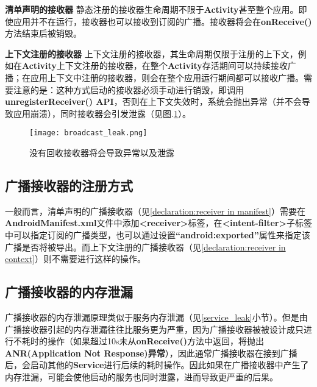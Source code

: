 \textbf{清单声明的接收器 } 静态注册的接收器生命周期不限于\textbf{Activity}甚至整个应用。即使应用并不在运行，接收器也可以接收到订阅的广播。接收器将会在\textbf{onReceive()}方法结束后被销毁。


\textbf{上下文注册的接收器 } 上下文注册的接收器，其生命周期仅限于注册的上下文，例如在\textbf{Activity}上下文注册的接收器，在整个\textbf{Activity}存活期间可以持续接收广播；在应用上下文中注册的接收器，则会在整个应用运行期间都可以接收广播。需要注意的是：这种方式启动的接收器必须手动进行销毁，即调用\textbf{unregisterReceiver() API}，否则在上下文失效时，系统会抛出异常（并不会导致应用崩溃），同时接收器会引发泄露（见图.\textcolor{red}{\ref{fig:broadcast_leak}}）。

\begin{figure}[htbp]
	\centering
	\texttt{[image: broadcast\_leak.png]} %
	\caption{没有回收接收器将会导致异常以及泄露}
	\label{fig:broadcast_leak}
\end{figure}

\subsection{广播接收器的注册方式}

一般而言，清单声明的广播接收器（见\ref{declaration:receiver in manifest}）需要在\textbf{AndroidManifest.xml}文件中添加\textbf{<receiver>}标签，在\textbf{<intent-filter>}子标签中可以指定订阅的广播类型，也可以通过设置\textbf{“android:exported”}属性来指定该广播是否将被导出。而上下文注册的广播接收器（见\ref{declaration:receiver in context}）则不需要进行这样的操作。
\subsection{广播接收器的内存泄漏}
广播接收器的内存泄漏原理类似于服务内存泄漏（见\ref{service_leak}小节）。但是由广播接收器引起的内存泄漏往往比服务更为严重，因为广播接收器被被设计成只进行不耗时的操作（如果超过10s未从\textbf{onReceive()}方法中返回，将抛出\textbf{ANR(Application Not Response)异常}），因此通常广播接收器在接到广播后，会启动其他的\textbf{Service}进行后续的耗时操作。因此如果在广播接收器中产生了内存泄漏，可能会使他启动的服务也同时泄露，进而导致更严重的后果。

